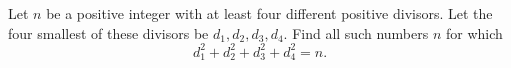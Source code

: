 Let $n$ be a positive integer with at least four different positive divisors.
Let the four smallest of these divisors be $d_1, d_2, d_3, d_4$.
Find all such numbers $n$ for which
$$d_1^2 + d_2^2 + d_3^2 + d_4^2 = n.$$
